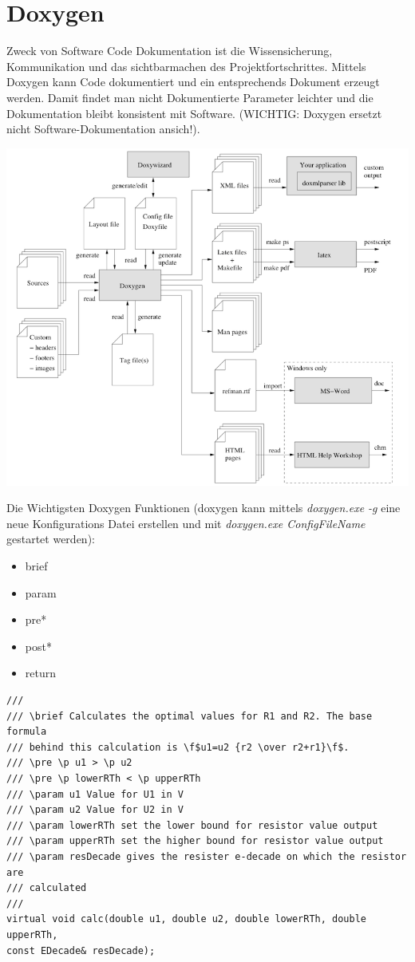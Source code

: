\section{Doxygen}
Zweck von Software Code Dokumentation ist die Wissensicherung, Kommunikation und das sichtbarmachen des Projektfortschrittes. Mittels Doxygen kann Code dokumentiert und ein entsprechends Dokument erzeugt werden. Damit findet man nicht Dokumentierte Parameter leichter und die Dokumentation bleibt konsistent mit Software. (WICHTIG: Doxygen ersetzt nicht Software-Dokumentation ansich!). 
\begin{center}
	\includegraphics[width=\columnwidth]{Images/doxygen}
\end{center}

Die Wichtigsten Doxygen Funktionen (doxygen kann mittels \textit{doxygen.exe -g} eine neue Konfigurations Datei erstellen und mit  \textit{doxygen.exe ConfigFileName} gestartet werden):
\begin{itemize}[nosep]
	\item brief
	\item param
	\item pre*
	\item post*
	\item return
\end{itemize}
\begin{lstlisting}
///
/// \brief Calculates the optimal values for R1 and R2. The base formula
/// behind this calculation is \f$u1=u2 {r2 \over r2+r1}\f$.
/// \pre \p u1 > \p u2
/// \pre \p lowerRTh < \p upperRTh
/// \param u1 Value for U1 in V
/// \param u2 Value for U2 in V
/// \param lowerRTh set the lower bound for resistor value output
/// \param upperRTh set the higher bound for resistor value output
/// \param resDecade gives the resister e-decade on which the resistor are
/// calculated
///
virtual void calc(double u1, double u2, double lowerRTh, double upperRTh,
const EDecade& resDecade);
\end{lstlisting}